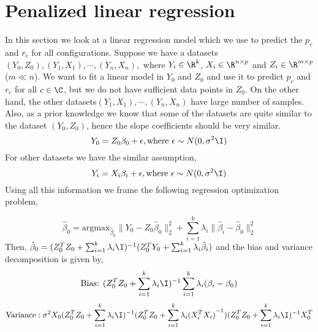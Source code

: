 
\section{Penalized linear regression}
\label{sec:linreg}
In this section we look at a linear regression model which we use to predict the
$p_c$ and $r_c$ for all configurations. Suppose we have a datasets $(Y_0, Z_0),
(Y_1, X_1),\cdots, (Y_n, X_n), $ where $Y_i \in \R^k$, $X_i \in \R^{n\times p}$
and $Z_i \in \R^{m\times p}$ ($m \ll n$). We want to fit a linear model in $Y_0$
and $Z_0$ and use it to predict $p_c $ and $r_c$ for all $c \in \C$, but we do not have sufficient data points in $Z_0$. On the other hand, the other datasets$  (Y_1, X_1),\cdots, (Y_n, X_n) $ have large number of samples. Also, as a prior knowledge we know that some of the datasets are quite similar to the dataset $(Y_0, Z_0)$, hence the slope coefficients should be very similar.
$$
Y_0 = Z_0 \beta_0 + \epsilon, \text{where } \epsilon \sim N(0,\sigma^2 \I)
$$
For other datasets we have the similar assumption,
$$
Y_i = X_i \beta_i + \epsilon, \text{where } \epsilon \sim N(0,\sigma^2 \I)
$$
Using all this information we frame the following regression optimization problem,

$$
\hat{\beta}_0 = \text{argmax}_{\hat{\beta}_0} \| Y_0 - Z_0 \hat{\beta}_0\|^2_2 + \sum_{i=1}^k \lambda_i  \| {\hat{\beta}_i} - {\hat{\beta}_0} \|^2_2
$$
Then, $\hat{\beta}_0 = (Z_0^TZ_0 + \sum_{i=1}^k \lambda_i \I)^{-1} (Z_0^TY_0 + \sum_{i=1}^k \lambda_i\hat{\beta}_i)$ and the bias and variance decomposition is given by,
$$
\text{Bias: }  (Z_0^TZ_0 + \sum_{i=1}^k \lambda_i \I)^{-1}  \sum_{i=1}^k \lambda_i(\beta_i- \beta_0)
$$
$$
\text{Variance}:
\sigma^2  X_0 
(Z_0^TZ_0 + \sum_{i=1}^k \lambda_i \I)^{-1} 
(Z_0^TZ_0 + \sum_{i=1}^k \lambda_i {(X_i^TX_i)}^{-1}) 
(Z_0^TZ_0 + \sum_{i=1}^k \lambda_i \I)^{-1}X_0^T
$$

